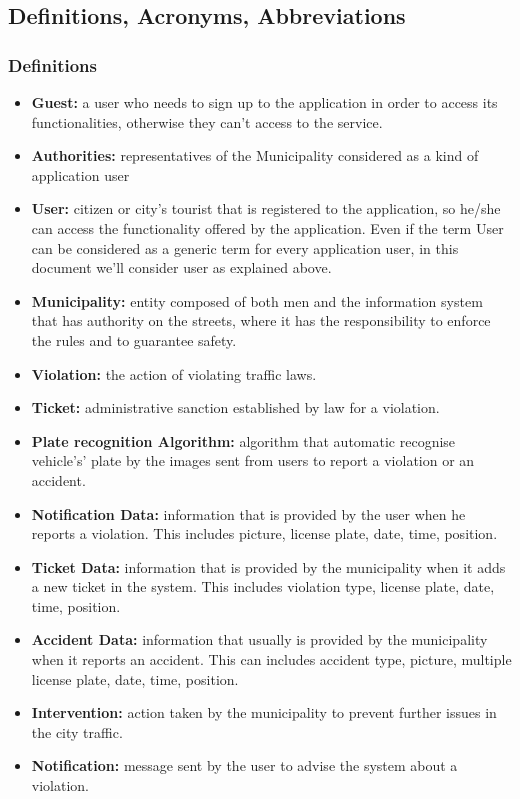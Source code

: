 \documentclass {article}
\begin{document}
	\subsection{Definitions, Acronyms, Abbreviations}
					
		\subsubsection{Definitions}
			
			\begin{itemize}
				\item {\bf Guest:} a user who needs to sign up to the application in order to access its functionalities, otherwise they can't access to the service.
				\item {\bf Authorities:} representatives of the Municipality considered as a kind of application user
				\item {\bf User:} citizen or city's tourist that is registered to the application, so he/she can access the functionality offered by the application. Even if the term User can be considered as a generic term for every application user, in this document we'll consider user as explained above.
				\item {\bf Municipality:} entity composed of both men and the information system that has authority on the streets, where it has the responsibility to enforce the rules and to guarantee safety. 
				\item {\bf Violation:} the action of violating traffic laws.
				\item {\bf Ticket:} administrative sanction established 	by law for a violation.
				\item {\bf Plate recognition Algorithm:} algorithm that 	automatic recognise vehicle's' plate by the images sent from users to report a violation or an accident.
				\item {\bf Notification Data:} information that is provided by the user when he reports a violation. This includes picture, license plate, date, time, position.
				\item {\bf Ticket Data:} information that is provided by the municipality when it adds a new ticket in the system. This includes violation type, license plate, date, time, position.
				\item {\bf Accident Data:} information that usually is 	provided by the municipality when it reports an accident. This can includes accident type, picture, multiple license plate, date, time, position.
				\item {\bf Intervention:} action taken by the municipality to prevent further issues in the city traffic.
				\item {\bf Notification:} message sent by the user to 						advise the system about a violation.
			\end{itemize}
		
\end{document}
